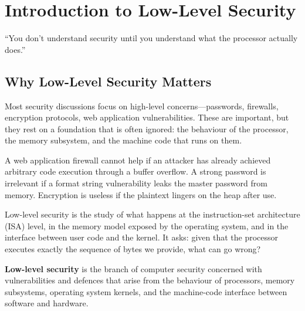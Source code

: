 \chapter{Introduction to Low-Level Security}
\label{ch:introduction}

\epigraph{``You don't understand security until you understand what the processor actually does.''}{}


\section{Why Low-Level Security Matters}

Most security discussions focus on high-level concerns---passwords, firewalls, encryption protocols, web application vulnerabilities. These are important, but they rest on a foundation that is often ignored: the behaviour of the processor, the memory subsystem, and the machine code that runs on them.

A web application firewall cannot help if an attacker has already achieved arbitrary code execution through a buffer overflow. A strong password is irrelevant if a format string vulnerability leaks the master password from memory. Encryption is useless if the plaintext lingers on the heap after use.

Low-level security is the study of what happens at the instruction-set architecture (ISA) level, in the memory model exposed by the operating system, and in the interface between user code and the kernel. It asks: given that the processor executes exactly the sequence of bytes we provide, what can go wrong?

\begin{definition}
	\textbf{Low-level security} is the branch of computer security concerned with vulnerabilities and defences that arise from the behaviour of processors, memory subsystems, operating system kernels, and the machine-code interface between software and hardware.
\end{definition}

